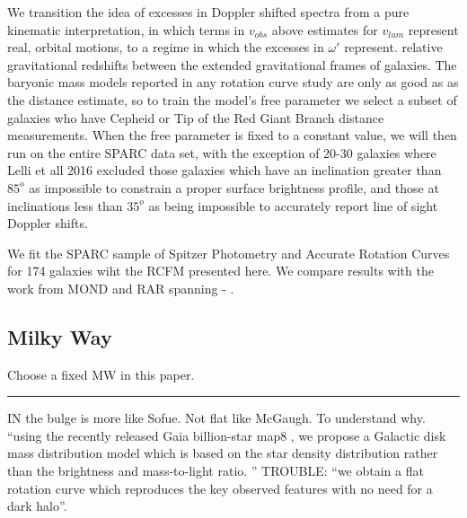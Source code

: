 \documentclass[reprint,%
 amsmath,amssymb,
 aps,
]{revtex4-1}
\begin{document}
We transition the idea of excesses in Doppler shifted spectra from a  pure kinematic interpretation, in which terms in  $v_{obs}$ above estimates for  $v_{lum}$ represent real, orbital motions, to a regime in which the excesses in $\omega'$ represent.
  relative gravitational redshifts between the extended gravitational  frames of  galaxies. 
 The baryonic mass models reported in any rotation curve study are only as good as    as the distance estimate, so to train the model's free parameter we select a subset of galaxies who have Cepheid or Tip of the Red Giant Branch distance measurements.  When the free parameter is fixed to a constant value, we will then run on the entire SPARC data set, with the exception of 20-30 galaxies where Lelli et all 2016 excluded those galaxies which have an inclination greater than $85^o$ as impossible to constrain a proper surface brightness profile, and those at inclinations less than $35^o$ as being impossible to accurately report line of sight Doppler shifts.   
 
 We fit the SPARC sample of Spitzer Photometry and Accurate Rotation Curves for 174 galaxies  \cite{2016Lelli} wiht the RCFM presented here. 
We compare results with the work from MOND and RAR spanning  \citet{McGaugh_2014}- \citet{Li_2018}. 
  
 
\subsection{Milky Way}
{\color{red}Choose a fixed MW in this paper. }

{\color{red} \rule{\linewidth}{0.5mm}}



IN \cite{Li2016ModellingMD} the bulge is more like Sofue. Not flat like McGaugh. 
To understand why. 
``using the recently released Gaia billion-star map8
, we propose a
Galactic disk mass distribution model which is based on the star density distribution
rather than the brightness and mass-to-light ratio. ''
TROUBLE: ``we obtain a flat rotation curve
which reproduces the key observed features with no need for a dark halo''.
\end{document}
